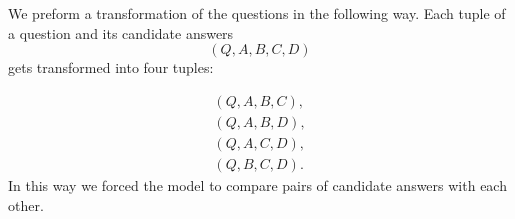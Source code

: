 We preform a transformation of the questions in the following way. Each tuple of a question and 
its candidate answers
$$
    (Q,A,B,C,D)
$$
gets transformed into four tuples:

\begin{align*}
       (Q,A,B,C), \\ 
       (Q,A,B,D), \\
       (Q,A,C,D), \\
       (Q,B,C,D).
\end{align*}
In this way we forced the model to compare pairs of candidate answers with each other.
